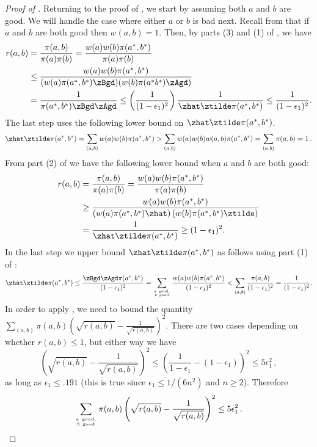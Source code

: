 \documentclass{toc}
\begin{document}
\begin{proof}[Proof of ]
Returning to the proof of , we start by assuming 
both $a$ and $b$ are good.  We will handle the case where either $a$ or $b$ is bad next.  
Recall from  that if $a$ and $b$ are both good then $w(a,b) = 1$.  Then, by parts (3) and 
(1) of , we have
\begin{align*}
  r(a,b)&=\frac{\pi(a,b)}{\pi(a)\pi(b)}=\frac{w(a)w(b)\pi(a^*,b^*)}{\pi(a)\pi(b)}\\
  &\leq \frac{w(a)w(b)\pi(a^*,b^*)}{(w(a)\pi(a^*,b^*)\zBgd)(w(b) \pi(a^*b^*)\zAgd)}\\
  &= \frac{1}{\pi(a^*,b^*)\zBgd\zAgd}\leq \left(\frac{1}{(1-\epsilon_1)^2}\right) \frac{1}{\zhat\ztilde \pi(a^*,b^*)} \leq \frac{1}{(1-\epsilon_1)^2}.
\end{align*}
The last step uses the following lower bound on $\zhat\ztilde\pi(a^*,b^*)$.
 $$\zhat\ztilde\pi(a^*,b^*) =\sum_{(a,b)} w(a)w(b) \pi(a^*,b^*) > \sum_{(a,b)} w(a)w(b) w(a,b)\pi(a^*,b^*)  = \sum_{(a,b)} \pi(a,b) = 1\,.$$
From part (2) of  we have the following lower 
bound when $a$ and $b$ are both good:
\begin{align*}
  r(a,b)&=\frac{\pi(a,b)}{\pi(a)\pi(b)}=\frac{w(a)w(b)\pi(a^*,b^*)}{\pi(a)\pi(b)}\\
  &\geq \frac{w(a)w(b)\pi(a^*,b^*)}{
     \left(w(a)\pi(a^*,b^*)\zhat\right)\left(w(b)\pi(a^*,b^*)\ztilde\right)}\\
  &= \frac{1}{
     \zhat\ztilde\pi(a^*,b^*)} \geq(1-\epsilon_1)^2.
\end{align*}
In the last step we upper bound $\zhat\ztilde\pi(a^*,b^*)$ as follows 
using part (1) of :
\begin{equation*}\label{prodBound}
\zhat\ztilde\pi(a^*,b^*) \leq\frac{\zBgd\zAgd\pi(a^*,b^*)}{ (1-\epsilon_1)^{2}}= \sum_{a~\text{good},\atop b~\text{good}} \frac{w(a)w(b) \pi(a^*,b^*)}{(1-\epsilon_1)^{2}}< \sum_{(a,b)}\frac{ \pi(a,b)}{(1-\epsilon_1)^{2}} = \frac{1}{(1-\epsilon_1)^{2}}.
\end{equation*}
In order to apply , we need to bound the 
quantity $\sum_{(a,b)}\pi(a,b)\left(\sqrt{r(a,b)}-\frac{1}{\sqrt{r(a,b)}}\right)^2$.  
There are two cases depending on whether $r(a,b)\leq 1$, but either
way we have
\[\left(\sqrt{r(a,b)}-\frac{1}{\sqrt{r(a,b)}}\right)^2\leq
  \left(\frac{1}{1-\epsilon_1} - (1-\epsilon_1)\right)^2\leq
  5\epsilon_1^2\,,\]
as long as $\epsilon_1\leq .191$ (this is true since $\epsilon_1\leq 
1/(6n^2)$ and $n\geq 2$).  Therefore
  \[\sum_{a~\text{good},\atop
    b~\text{good}}\pi(a,b)\left(\sqrt{r(a,b)}-\frac{1}{\sqrt{r(a,b)}}\right)^2\leq
  5\epsilon_1^2\,.\]
  

\end{proof}
\end{document}
